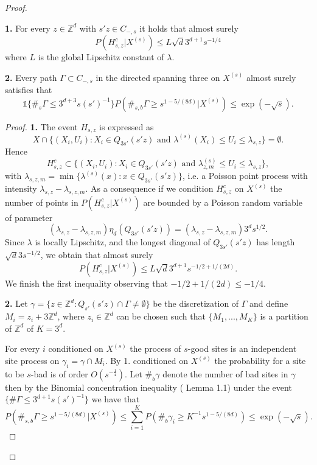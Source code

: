 \begin{proof}
\begin{lem}\label{lem2.9}

\textbf{1.} For every $z\in\mathbb{Z}^d$ with $s'z\in C_{-,s}$ it holds that almost surely $$P(H_{s,z}^c\vert X^{(s)})\leq L \sqrt{d}3^{d+1}s^{-1/4}$$ where $L$ is the global Lipschitz constant of $\lambda$. 

\textbf{2.} Every path $\Gamma\subset C_{-,s}$ in the directed spanning three on $X^{(s)}$ almost surely satisfies that
$$\mathds{1}\lbrace \#_s\Gamma\leq 3^{d+3}s(s')^{-1}\rbrace P(\#_{s,b}\Gamma\geq  s^{1-5/(8d)}\vert X^{(s)})\leq\exp (-\sqrt{s}).$$
\end{lem}
\begin{proof}

\textbf{1.} The event $H_{s,z}$ is expressed as $$X  \cap\lbrace (X_i, U_i): X_i \in Q_{3s'}(s'z)\mbox{ and }\lambda^{(s)}(X_i)\leq U_i \leq\lambda_{s,z}\rbrace=\emptyset .$$
Hence $$H_{s,z}^{c}\subset\lbrace (X_i, U_i): X_i \in Q_{3s'}(s'z)\mbox{ and }\lambda^{(s)}_{z,m}\leq U_{i}\leq\lambda_{s,z}\rbrace,$$ with $\lambda_{s, z, m}=\min\lbrace \lambda^{(s)}(x):x\in Q_{3s'}(s'z)\rbrace$, i.e. a Poisson point process with intensity $\lambda_{s,z}-\lambda_{s, z, m}$. As a consequence if we condition $H_{s,z}^c$ on $X^{(s)}$ the number of points in $P(H_{s,z}^c\vert X^{(s)})$ are bounded by a Poisson random variable of parameter $$(\lambda_{s,z}-\lambda_{s, z, m})\eta_d( Q_{3s'}(s'z))=(\lambda_{s,z}-\lambda_{s, z, m})3^ds^{1/2}. $$ Since $\lambda$ is locally Lipschitz, and the longest diagonal of $Q_{3s'}(s'z)$ has length $\sqrt{d}3s^{-1/2}$, we obtain that almost surely
$$P(H_{s,z}^c\vert X^{(s)})\leq L\sqrt{d}3^{d+1}s^{-1/2+1/(2d)}.$$
We finish the first inequality  observing that $-1/2+1/(2d)\leq -1/4$.

\textbf{2.} Let $\gamma=\lbrace z\in\mathbb{Z}^d: Q_{s'}(s'z)\cap\Gamma\neq\emptyset\rbrace$ be the discretization of $\Gamma$ and define $M_i=z_i+3\mathbb{Z}^d$, where $z_i\in\mathbb{Z}^d$ can be chosen such that $\lbrace M_1, ...,M_K\rbrace$ is a partition of $\mathbb{Z}^d$ of $K=3^d$.

For every $i$ conditioned on $X^{(s)}$ the process of $s$-good sites is an independent site process on $\gamma_i=\gamma\cap M_i$. By 1. conditioned on $X^{(s)}$ the probability for a site to be $s$-bad is of order $O(s^{-\frac{1}{4}})$. Let $\#_b \gamma$ denote the number of bad sites in $\gamma$ then by the Binomial concentration inequality (\cite{Pen} Lemma 1.1) under the event $\lbrace \#\Gamma\leq 3^{d+1}s(s')^{-1}\rbrace$ we have that
$$P(\#_{s,b}\Gamma\geq  s^{1-5/(8d)}\vert X^{(s)})\leq \sum_{i=1}^K P(\#_b \gamma_i \geq K^{-1}s^{1-5/(8d)})\leq\exp (-\sqrt{s}).$$
\end{proof}


\end{proof}
